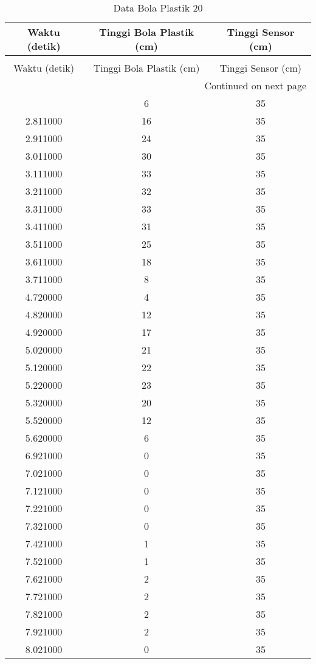 \begin{longtable}[htbp]{|c|c|c|}
\caption{Data Bola Plastik 20} \\
\hline
Waktu (detik) & Tinggi Bola Plastik (cm) & Tinggi Sensor (cm) \\ \hline
\endfirsthead
\caption[]{Data Bola Plastik 20} \\
\hline
Waktu (detik) & Tinggi Bola Plastik (cm) & Tinggi Sensor (cm) \\ \hline
\endhead
\multicolumn{3}{r}{Continued on next page} \\
\endfoot
\endlastfoot
2.711000 & 6 & 35 \\ \hline
2.811000 & 16 & 35 \\ \hline
2.911000 & 24 & 35 \\ \hline
3.011000 & 30 & 35 \\ \hline
3.111000 & 33 & 35 \\ \hline
3.211000 & 32 & 35 \\ \hline
3.311000 & 33 & 35 \\ \hline
3.411000 & 31 & 35 \\ \hline
3.511000 & 25 & 35 \\ \hline
3.611000 & 18 & 35 \\ \hline
3.711000 & 8 & 35 \\ \hline
4.720000 & 4 & 35 \\ \hline
4.820000 & 12 & 35 \\ \hline
4.920000 & 17 & 35 \\ \hline
5.020000 & 21 & 35 \\ \hline
5.120000 & 22 & 35 \\ \hline
5.220000 & 23 & 35 \\ \hline
5.320000 & 20 & 35 \\ \hline
5.520000 & 12 & 35 \\ \hline
5.620000 & 6 & 35 \\ \hline
6.921000 & 0 & 35 \\ \hline
7.021000 & 0 & 35 \\ \hline
7.121000 & 0 & 35 \\ \hline
7.221000 & 0 & 35 \\ \hline
7.321000 & 0 & 35 \\ \hline
7.421000 & 1 & 35 \\ \hline
7.521000 & 1 & 35 \\ \hline
7.621000 & 2 & 35 \\ \hline
7.721000 & 2 & 35 \\ \hline
7.821000 & 2 & 35 \\ \hline
7.921000 & 2 & 35 \\ \hline
8.021000 & 0 & 35 \\ \hline
\end{longtable}
